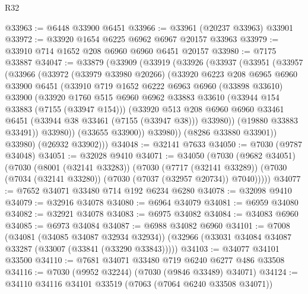 \begin{lexlean}{R32}
\begin{coremodule}
@33963 := @6448 @33900 @6451
@33966 := @33961 (@20237 @33963) @33901
@33972 := @33920 @1654 @6225 @6962 @6967 @20157 @33963
@33979 := @33910 @714 @1652 @208 @6960 @6960 @6451 @20157
@33980 := @7175 @33887
@34047 := @33879
    (@33909
      (@33919
        (@33926
          (@33937
            (@33951
              (@33957
                (@33966
                  (@33972
                    (@33979 @33980 @20266)
                    (@33920
                      @6223
                      @208
                      @6965
                      @6960
                      @33900
                      @6451
                      (@33910
                        @719
                        @1652
                        @6222
                        @6963
                        @6960
                        (@33898 @33610)
                        @33900
                        (@33920
                          @1760
                          @515
                          @6960
                          @6962
                          @33883
                          @33610
                          (@33944 @154 @33883 (@7155 (@33947 @154)))
                          (@33920
                            @513
                            @208
                            @6960
                            @6960
                            @33461
                            @6451
                            (@33944 @38 @33461 (@7155 (@33947 @38)))
                            @33980))
                        (@19880 @33883 @33491))
                      @33980))
                  (@33655 @33900))
                @33980))
            (@8286 @33880 @33901))
          @33980)
        (@26932 @33902)))
@34048 := @32141 @7633
@34050 := @7030 (@9787 @34048)
@34051 := @32028 @9410
@34071 := @34050
    (@7030
      (@9682 @34051)
      (@7030
        (@8001 (@32141 @33283))
        (@7030
          (@7717 (@32141 @33289))
          (@7030 (@7034 (@32141 @33280)) (@7030 (@7037 (@32957 @20734)) @7040)))))
@34077 := @7652 @34071 @33480 @714 @192 @6234 @6280
@34078 := @32098 @9410
@34079 := @32916 @34078
@34080 := @6964 @34079
@34081 := @6959 @34080
@34082 := @32921 @34078
@34083 := @6975 @34082
@34084 := @34083 @6960
@34085 := @6973 @34084
@34087 := @6988 @34082 @6960
@34101 := @7008
    (@34081 (@34085 @34087 @32934 @32934))
    (@32966 (@33031 @34084 @34087 @33287 (@33007 (@33841 (@33290 @33843)))))
@34103 := @34077 @34101 @33500
@34110 := @7681 @34071 @33480 @719 @6240 @6277 @486 @33508
@34116 := @7030 (@9952 @32244) (@7030 (@9846 @33489) @34071)
@34124 := @34110 @34116 @34101 @33519 (@7063 (@7064 @6240 @33508 @34071))

\end{coremodule}
\end{lexlean}
